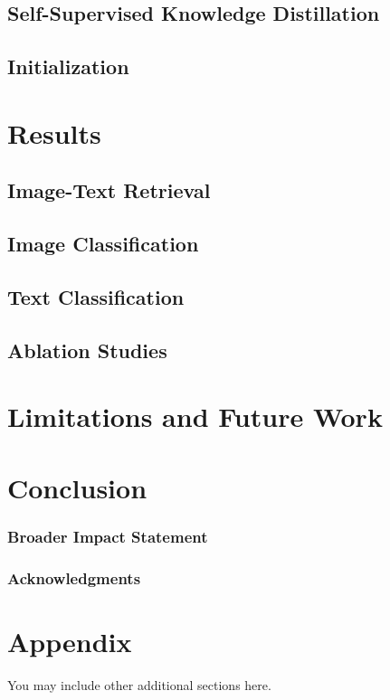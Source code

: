 \documentclass[10pt]{article} %
\begin{document}
\subsection{Self-Supervised Knowledge Distillation}
\subsection{Initialization}


\section{Results}
\subsection{Image-Text Retrieval}
\subsection{Image Classification}
\subsection{Text Classification}
\subsection{Ablation Studies}
\section{Limitations and Future Work}
\section{Conclusion}


\subsubsection*{Broader Impact Statement}




\subsubsection*{Acknowledgments}





\appendix
\section{Appendix}
You may include other additional sections here.
\end{document}
